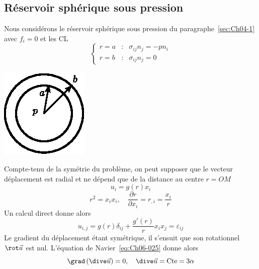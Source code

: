 \subsection{Réservoir sphérique sous pression} \label{ssec:Ch06-2.2}
\begin{multicols}{2}
    Nous considérons le réservoir sphérique sous pression du paragraphe~\ref{sec:Ch04-1} avec $f_i = 0$ et les CL
    \begin{equation}
        \left\{
        \begin{aligned}
            r=a &:& \sigma_{ij} n_j = -p n_i \\
            r=b &:& \sigma_{ij} n_j = 0
        \end{aligned}
        \right.
        \label{eq:Ch06-042}
    \end{equation}
    \columnbreak
    \begin{center}
        \includegraphics{../images/T1_Ch06-03}
    \end{center}
\end{multicols}
Compte-tenu de la symétrie du problème, on peut supposer que le vecteur déplacement est radial et ne dépend que de la distance au centre $r=OM$
\begin{equation}
    u_i = g(r) x_i
    \label{eq:Ch04-043}
\end{equation}
\begin{equation}
    r^2 = x_i x_i,\quad \frac{\partial r}{\partial x_i} = r_{,i} = \frac{x_i}{r}
    \label{eq:Ch04-044}
\end{equation}
Un calcul direct donne alors
\begin{equation}
    u_{i,j} = g(r) \delta_{ij} + \frac{g'(r)}{r} x_i x_j = \varepsilon_{ij}
    \label{eq:Ch06-045}
\end{equation}
Le gradient du déplacement étant symétrique, il s'ensuit que son rotationnel $\rot \vec{u}$ est nul.
L'équation de Navier~\eqref{eq:Ch06-025} donne alors
\begin{equation}
    \grad \left( \dive \vec{u} \right) = 0 ,\quad \dive \vec{u} = \text{Cte} = 3 \alpha
    \label{eq:Ch06-046}
\end{equation}

